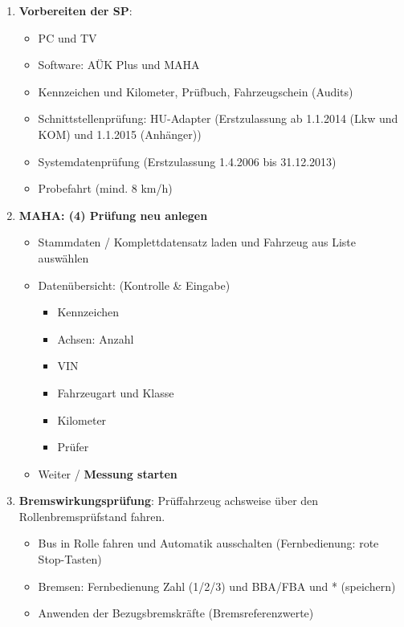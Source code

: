 \documentclass{vorlage-design-main}
\begin{document}
\begin{enumerate}
\def\labelenumi{\arabic{enumi}.}
\item
  \textbf{Vorbereiten der SP}:

  \begin{itemize}
  
  \item
    PC und TV
  \item
    Software: AÜK Plus und MAHA
  \item
    Kennzeichen und Kilometer, Prüfbuch, Fahrzeugschein (Audits)
  \item
    Schnittstellenprüfung: HU-Adapter (Erstzulassung ab 1.1.2014 (Lkw
    und KOM) und 1.1.2015 (Anhänger))
  \item
    Systemdatenprüfung (Erstzulassung 1.4.2006 bis 31.12.2013)
  \item
    Probefahrt (mind. 8 km/h)
  \end{itemize}
\item
  \textbf{MAHA: (4) Prüfung neu anlegen}

  \begin{itemize}
  
  \item
    Stammdaten / Komplettdatensatz laden und Fahrzeug aus Liste
    auswählen
  \item
    Datenübersicht: (Kontrolle \& Eingabe)

    \begin{itemize}
    
    \item
      Kennzeichen
    \item
      Achsen: Anzahl
    \item
      VIN
    \item
      Fahrzeugart und Klasse
    \item
      Kilometer
    \item
      Prüfer
    \end{itemize}
  \item
    Weiter / \textbf{Messung starten}
  \end{itemize}
\item
  \textbf{Bremswirkungsprüfung}: Prüffahrzeug achsweise über den
  Rollenbremsprüfstand fahren.

  \begin{itemize}
  
  \item
    Bus in Rolle fahren und Automatik ausschalten (Fernbedienung: rote
    Stop-Tasten)
  \item
    Bremsen: Fernbedienung Zahl (1/2/3) und BBA/FBA und * (speichern)
  \item
    Anwenden der Bezugsbremskräfte (Bremsreferenzwerte)


\end{itemize}
\end{enumerate}
\end{document}
